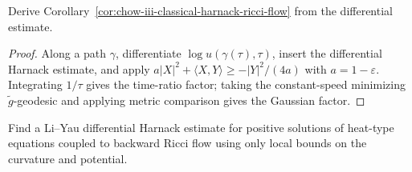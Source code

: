 \begin{example}
\label{ex:chow-iii-integrate-ricci-flow-gradient-estimate}
Derive Corollary~\ref{cor:chow-iii-classical-harnack-ricci-flow} from the
differential estimate.
\end{example}
\begin{proof}
Along a path \(\gamma\), differentiate \(\log u(\gamma(\tau),\tau)\), insert
the differential Harnack estimate, and apply
\(a|X|^2+\langle X,Y\rangle\geq-|Y|^2/(4a)\) with
\(a=1-\varepsilon\).  Integrating \(1/\tau\) gives the time-ratio factor;
taking the constant-speed minimizing \(\widetilde g\)-geodesic and applying
metric comparison gives the Gaussian factor.
\end{proof}

\begin{example}
\label{ex:chow-iii-local-li-yau-backward-ricci-flow}
Find a Li--Yau differential Harnack estimate for positive solutions of
heat-type equations coupled to backward Ricci flow using only local bounds on
the curvature and potential.
\end{example}
